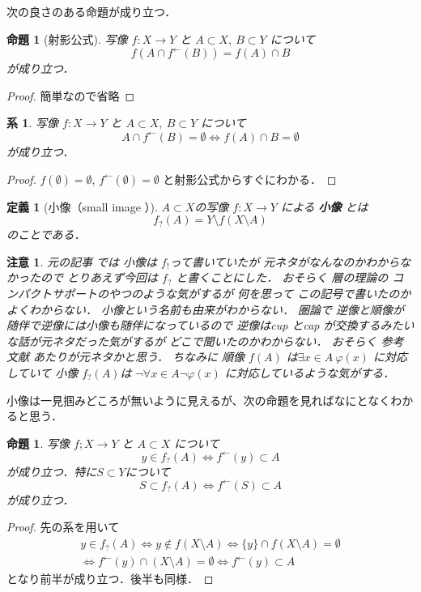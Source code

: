 \documentclass[leqno, a4paper, 12pt]{jsarticle}
\newtheorem{prop}[thm]{命題}
\newtheorem{cor}[thm]{系}
\newtheorem{df}[thm]{定義}
\newtheorem*{rmk}{注意}
\newcommand{\myinv}[1]{#1^{\gets}}
\newcommand{\mysm}[1]{#1_{?}}
\begin{document}
次の良さのある命題が成り立つ．
\begin{prop}[射影公式]\label{prop:yoi}
写像
$f:X\to Y$
と
$A\subset X,\ B\subset Y$
について
\[
f(A\cap \myinv{f}(B))=f(A)\cap B
\]
が成り立つ．
\end{prop}
\begin{proof}
簡単なので省略
\end{proof}
\begin{cor}\label{cor:yosa}
写像
$f:X\to Y$
と
$A\subset X,\ B\subset Y$
について
\[
A\cap \myinv{f}(B)=\emptyset\iff f(A)\cap B=\emptyset
\]
が成り立つ．
\end{cor}
\begin{proof}
$f(\emptyset)=\emptyset$, 
$\myinv{f}(\emptyset)=\emptyset$
と射影公式からすぐにわかる．
\end{proof}
\begin{df}[小像（small image ）]$A\subset X$の写像
$f:X\to Y$
による
\textbf{小像}
とは
\[
\mysm{f}(A)=Y\setminus f(X\setminus A)
\]
のことである．
\end{df}
\begin{rmk}
元の記事
\cite{Den2}
では
小像は
$f_{!}$って書いていたが
元ネタがなんなのかわからなかったので
とりあえず今回は
$\mysm{f}$
と書くことにした．
おそらく
層の理論の
コンパクトサポートのやつのような気がするが
何を思って
この記号で書いたのかよくわからない．
小像という名前も由来がわからない．
圏論で
逆像と順像が随伴で逆像には小像も随伴になっているので
逆像はcup とcap
が交換するみたいな話が元ネタだった気がするが
どこで聞いたのかわからない．
おそらく
参考文献
\cite{tog}
あたりが元ネタかと思う．
ちなみに
順像
$f(A)$
は$\exists x\in A \ \varphi(x)$
に対応していて
小像
$\mysm{f}(A)$は
$\lnot \forall x\in A \lnot \varphi(x)$
に対応しているような気がする．
\end{rmk}
小像は一見掴みどころが無いように見えるが、次の命題を見ればなにとなくわかると思う．
\begin{prop}\label{prop:wakari}
写像
$f;X\to Y$
と
$A\subset X$
について
\[
y\in \mysm{f}(A)\iff \myinv{f}(y)\subset A
\]
が成り立つ．特に$S\subset Y$について
\[
S\subset \mysm{f}(A)\iff \myinv{f}(S)\subset A
\]
が成り立つ．
\end{prop}
\begin{proof}
先の系を用いて
\begin{eqnarray*}
y\in \mysm{f}(A)\iff y\not\in f(X\setminus A)\iff \{y\}\cap f(X\setminus A)=\emptyset
\\ 
\iff \myinv{f}(y)\cap (X\setminus A)=\emptyset
\iff \myinv{f}(y)\subset A
\end{eqnarray*}
となり前半が成り立つ．後半も同様．
\end{proof}
\end{document}
